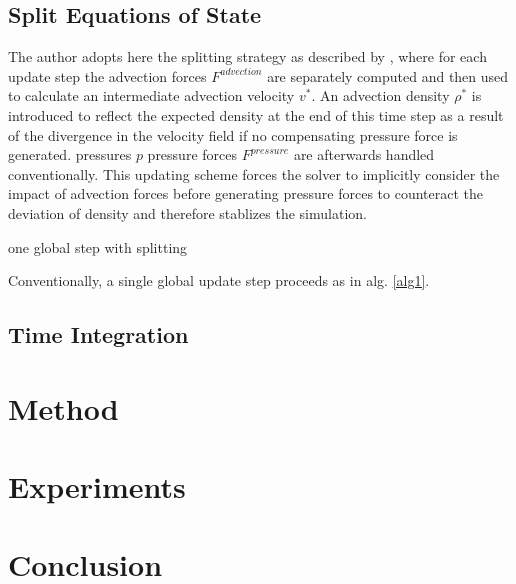 \documentclass[
	11pt, 
	DIV10,
	ngerman,
	a4paper, 
	oneside, 
	headings=normal, 
	captions=tableheading,
	final, 
	numbers=noenddot
]{scrartcl}
\begin{document}
\subsection{Split Equations of State}

The author adopts here the splitting strategy as described by \cite{ihmsen2014sph}, where for each update step the advection forces $ F^{advection} $ are separately computed and then used to calculate an intermediate advection velocity $ v^{*} $. An advection density $ \rho^{*} $ is introduced to reflect the expected density at the end of this time step as a result of the divergence in the velocity field if no compensating pressure force is generated. pressures $ p $ pressure forces $ F^{pressure} $ are afterwards handled conventionally. This updating scheme forces the solver to implicitly consider the impact of advection forces before generating pressure forces to counteract the deviation of density and therefore stablizes the simulation.

\vskip 0.2in
\begin{algorithm}[H]
	\caption{one global step with splitting \cite{reinhardt2017fully}}
	\label{alg1}
	\DontPrintSemicolon
	\SetAlgoLined
\end{algorithm}
\vskip 0.2in

Conventionally, a single global update step proceeds as in alg. \ref{alg1}. 


\subsection{Time Integration}


\section{Method}

\section{Experiments}

\section{Conclusion}



\end{document}
